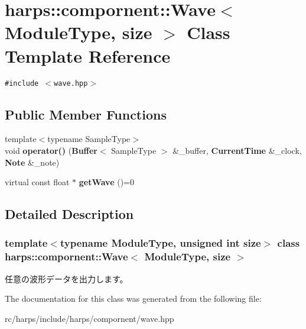 \section{harps::compornent::Wave$<$ ModuleType, size $>$ Class Template Reference}
\label{classharps_1_1compornent_1_1Wave}
{\tt \#include $<$wave.hpp$>$}

\subsection*{Public Member Functions}
\begin{CompactItemize}
\item 
{\footnotesize template$<$typename SampleType$>$ }\\void \textbf{operator()} ({\bf Buffer}$<$ SampleType $>$ \&\_\-buffer, {\bf CurrentTime} \&\_\-clock, {\bf Note} \&\_\-note)\label{classharps_1_1compornent_1_1Wave_68ffeef1ee9d0c47e0318f05b4a7089e}

\item 
virtual const float $\ast$ \textbf{getWave} ()=0\label{classharps_1_1compornent_1_1Wave_e43fbb17ad503cbf13ca2a956e148c60}

\end{CompactItemize}


\subsection{Detailed Description}
\subsubsection*{template$<$typename ModuleType, unsigned int size$>$ class harps::compornent::Wave$<$ ModuleType, size $>$}

任意の波形データを出力します。 

The documentation for this class was generated from the following file:\begin{CompactItemize}
\item 
rc/harps/include/harps/compornent/wave.hpp\end{CompactItemize}
